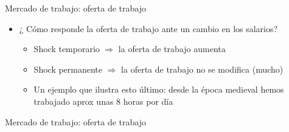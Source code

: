 \documentclass{beamer}
\begin{document}
\begin{frame}{Mercado de trabajo: oferta de trabajo}

\begin{itemize}
    \item ¿ Cómo responde la oferta de trabajo ante un cambio en los salarios?
    \vspace{2mm}
    \begin{itemize}
    \item Shock temporario $\Rightarrow$ la oferta de trabajo aumenta \vspace{1mm}
    \item Shock permanente $\Rightarrow$ la oferta de trabajo no se modifica (mucho) \vspace{1mm}
   \item Un ejemplo que ilustra esto último: desde la época medieval hemos trabajado aprox unas 8 horas por día
    \end{itemize}
\end{itemize}
\end{frame}

\begin{frame}{Mercado de trabajo: oferta de trabajo}
\begin{figure}[H]
\renewcommand{\figurename}{Figure}
\begin{center}
\end{center}
\end{figure}
\end{frame}
\end{document}
